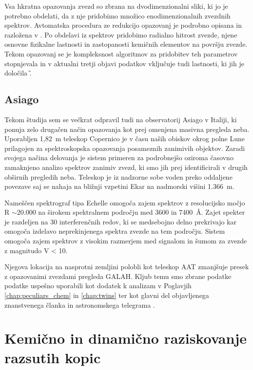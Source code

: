 Vsa hkratna opazovanja zvezd so zbrana na dvodimenzionalni sliki, ki jo je potrebno obdelati, da z nje pridobimo množico enodimenzionalnih zvezdnih spektrov. Avtomatska procedura ze redukcijo opazovanj je podrobno opisana in razložena v \citet{2017MNRAS.464.1259K}. Po obdelavi iz spektrov pridobimo radialno hitrost zvezde, njene osnovne fizikalne lastnosti in zastopanosti kemičnih elementov na površju zvezde. Tekom opazovanj se je kompleksnost algoritmov za pridobitev teh parametrov stopnjevala in v aktualni tretji objavi podatkov vključuje tudi lastnosti, ki jih je določila \G. 

\subsection{Asiago}
\label{sec:slo_asiago}
Tekom študija sem se večkrat odpravil tudi na observatorij Asiago v Italiji, ki ponuja zelo drugačen način opazovanja kot prej omenjena masivna pregleda neba. Uporabljen 1,82~m teleskop Copernico je v času naših obiskov okrog polne Lune prilagojen za spektroskopska opazovanja posameznih zanimivih objektov. Zaradi svojega načina delovanja je sistem primeren za podrobnejšo oziroma časovno zamaknjeno analizo spektrov zanimiv zvezd, ki smo jih prej identificirali v drugih obširnih pregledih neba. Teleskop je iz nadzorne sobe voden preko oddaljene povezave saj se nahaja na bližnji vzpetini Ekar na nadmorski višini 1.366~m. 

Nameščen spektrograf tipa Echelle omogoča zajem spektrov z resolucijsko močjo R $\sim$20.000 na širokem spektralnem področju med 3600 in 7400~\AA. Zajet spekter je razdeljen na 30 interferenčnih redov, ki se medsebojno delno prekrivajo kar omogoča izdelavo neprekinjenega spektra zvezde na tem področju. Sistem omogoča zajem spektrov z visokim razmerjem med signalom in šumom za zvezde z magnitudo V < 10. 

Njegova lokacija na nasprotni zemljini polobli kot teleskop AAT zmanjšuje presek z opazovanimi zvezdami pregleda GALAH. Kljub temu smo zbrane podatke podatke uspešno uporabili kot dodatek k analizam v Poglavjih \ref{chap:peculiars_chem} in \ref{chap:twins} ter kot glavni del objavljenega znanstvenega članka \cite{2019MNRAS.488.5536M} in astronomskega telegrama \cite{2019ATel13340....1M}.

\section{Kemično in dinamično raziskovanje razsutih kopic}
\label{sec:slo_kopice_taziskovanje}



